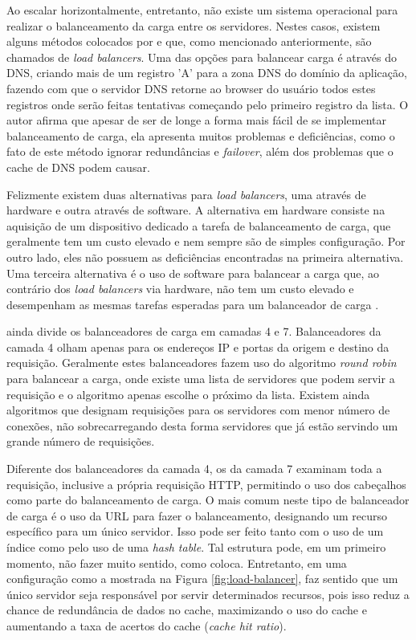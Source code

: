 \documentclass[diss]{template/setrem}
\begin{document}
Ao escalar horizontalmente, entretanto, não existe um sistema operacional para realizar o balanceamento da carga entre os servidores. Nestes casos, existem alguns métodos colocados por \citet{Henderson2006} e que, como mencionado anteriormente, são chamados de \emph{load balancers}. Uma das opções para balancear carga é através do DNS, criando mais de um registro 'A' para a zona DNS do domínio da aplicação, fazendo com que o servidor DNS retorne ao browser do usuário todos estes registros onde serão feitas tentativas começando pelo primeiro registro da lista. O autor afirma que apesar de ser de longe a forma mais fácil de se implementar balanceamento de carga, ela apresenta muitos problemas e deficiências, como o fato de este método ignorar redundâncias e \emph{failover}, além dos problemas que o cache de DNS podem causar.

Felizmente existem duas alternativas para \emph{load balancers}, uma através de hardware e outra através de software. A alternativa em hardware consiste na aquisição de um dispositivo dedicado a tarefa de balanceamento de carga, que geralmente tem um custo elevado e nem sempre são de simples configuração. Por outro lado, eles não possuem as deficiências encontradas na primeira alternativa. Uma terceira alternativa é o uso de software para balancear a carga que, ao contrário dos \emph{load balancers} via hardware, não tem um custo elevado e desempenham as mesmas tarefas esperadas para um balanceador de carga \citep{Henderson2006}.

\citet{Henderson2006} ainda divide os balanceadores de carga em camadas 4 e 7. Balanceadores da camada 4 olham apenas para os endereços IP e portas da origem e destino da requisição. Geralmente estes balanceadores fazem uso do algoritmo \emph{round robin} para balancear a carga, onde existe uma lista de servidores que podem servir a requisição e o algoritmo apenas escolhe o próximo da lista. Existem ainda algoritmos que designam requisições para os servidores com menor número de conexões, não sobrecarregando desta forma servidores que já estão servindo um grande número de requisições.

Diferente dos balanceadores da camada 4, os da camada 7 examinam toda a  requisição, inclusive a própria requisição HTTP, permitindo o uso dos cabeçalhos como parte do balanceamento de carga. O mais comum neste tipo de balanceador de carga é o uso da URL para fazer o balanceamento, designando um recurso específico para um único servidor. Isso pode ser feito tanto com o uso de um índice como pelo uso de uma \emph{hash table}. Tal estrutura pode, em um primeiro momento, não fazer muito sentido, como \citet{Henderson2006} coloca. Entretanto, em uma configuração como a mostrada na Figura \ref{fig:load-balancer}, faz sentido que um único servidor seja responsável por servir determinados recursos, pois isso reduz a chance de redundância de dados no cache, maximizando o uso do cache e aumentando a taxa de acertos do cache (\emph{cache hit ratio}).
\end{document}
